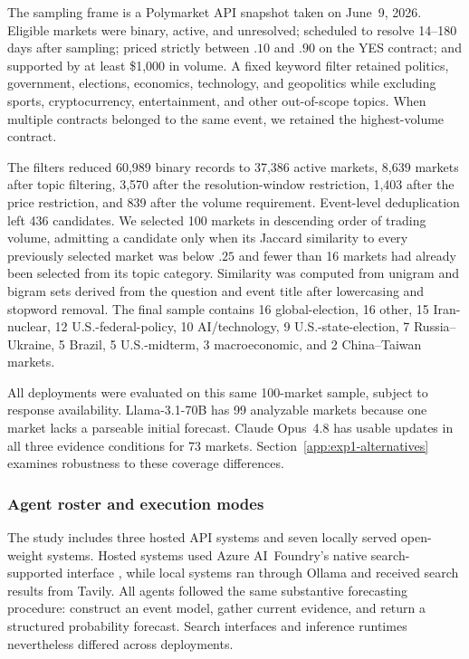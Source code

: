 The sampling frame is a Polymarket API snapshot taken on June~9, 2026.
Eligible markets were binary, active, and unresolved; scheduled to resolve 14--180 days after sampling; priced strictly between $.10$ and $.90$ on the YES contract; and supported by at least \$1,000 in volume.
A fixed keyword filter retained politics, government, elections, economics, technology, and geopolitics while excluding sports, cryptocurrency, entertainment, and other out-of-scope topics.
When multiple contracts belonged to the same event, we retained the highest-volume contract.

The filters reduced 60,989 binary records to 37,386 active markets, 8,639 markets after topic filtering, 3,570 after the resolution-window restriction, 1,403 after the price restriction, and 839 after the volume requirement.
Event-level deduplication left 436 candidates.
We selected 100 markets in descending order of trading volume, admitting a candidate only when its Jaccard similarity to every previously selected market was below $.25$ and fewer than 16 markets had already been selected from its topic category.
Similarity was computed from unigram and bigram sets derived from the question and event title after lowercasing and stopword removal.
The final sample contains 16 global-election, 16 other, 15 Iran-nuclear, 12 U.S.-federal-policy, 10 AI/technology, 9 U.S.-state-election, 7 Russia--Ukraine, 5 Brazil, 5 U.S.-midterm, 3 macroeconomic, and 2 China--Taiwan markets.

All deployments were evaluated on this same 100-market sample, subject to response availability.
Llama-3.1-70B has 99 analyzable markets because one market lacks a parseable initial forecast.
Claude Opus~4.8 has usable updates in all three evidence conditions for 73 markets.
Section~\ref{app:exp1-alternatives} examines robustness to these coverage differences.

\subsubsection{Agent roster and execution modes}
\label{app:agent-roster}

The study includes three hosted API systems and seven locally served open-weight systems.
Hosted systems used Azure AI~Foundry's native search-supported interface \citep{microsoft2026foundry}, while local systems ran through Ollama \citep{ollama2026} and received search results from Tavily.
All agents followed the same substantive forecasting procedure: construct an event model, gather current evidence, and return a structured probability forecast.
Search interfaces and inference runtimes nevertheless differed across deployments.

